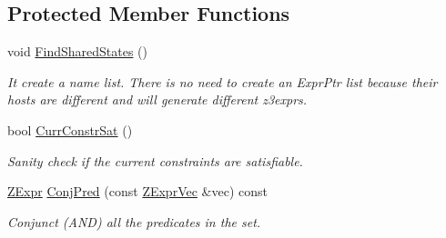 \subsection*{Protected Member Functions}
\begin{DoxyCompactItemize}
\item 
\mbox{\label{classilang_1_1_inter_ila_unroller_aea10fd80ffa6f186591735812473d54c}} 
void \mbox{\hyperlink{classilang_1_1_inter_ila_unroller_aea10fd80ffa6f186591735812473d54c}{Find\+Shared\+States}} ()
\begin{DoxyCompactList}\small\item\em It create a name list. There is no need to create an Expr\+Ptr list because their hosts are different and will generate different z3exprs. \end{DoxyCompactList}\item 
\mbox{\label{classilang_1_1_inter_ila_unroller_aed907c324b08115a75807052e25b3bb9}} 
bool \mbox{\hyperlink{classilang_1_1_inter_ila_unroller_aed907c324b08115a75807052e25b3bb9}{Curr\+Constr\+Sat}} ()
\begin{DoxyCompactList}\small\item\em Sanity check if the current constraints are satisfiable. \end{DoxyCompactList}\item 
\mbox{\label{classilang_1_1_inter_ila_unroller_aba6ea3c5d710936ec0d869d584cc96fd}} 
\mbox{\hyperlink{classilang_1_1_inter_ila_unroller_a35e84754b0b5b10deee54b2ef7421ab1}{Z\+Expr}} \mbox{\hyperlink{classilang_1_1_inter_ila_unroller_aba6ea3c5d710936ec0d869d584cc96fd}{Conj\+Pred}} (const \mbox{\hyperlink{classilang_1_1_inter_ila_unroller_ae83ebf1fea382fb26be5c53052e86ae4}{Z\+Expr\+Vec}} \&vec) const
\begin{DoxyCompactList}\small\item\em Conjunct (A\+ND) all the predicates in the set. \end{DoxyCompactList}\end{DoxyCompactItemize}
